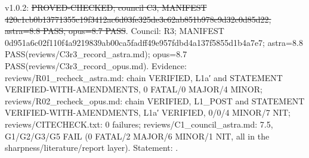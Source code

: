 \begin{theorem}\label{reg:W3-POST_Thm-1}
\end{theorem}
\begin{statusbox}
 v1.0.2: \st{PROVED-CHECKED; council C3, MANIFEST 420c1cb0b13771355c19f3412ac6d03fe325de3c62ab851b978c9d32c0d85d22, astra=8.8 PASS, opus=8.7 PASS}. Council: R3; MANIFEST 0d951a6c02f110f4a9219839ab00ca5fadff49e957fdbd4a137f5855d1b4a7e7; astra=8.8 PASS(reviews/C3r3\_record\_astra.md); opus=8.7 PASS(reviews/C3r3\_record\_opus.md). Evidence: reviews/R01\_recheck\_astra.md: chain VERIFIED, L1a′ and STATEMENT VERIFIED-WITH-AMENDMENTS, 0 FATAL/0 MAJOR/4 MINOR; reviews/R02\_recheck\_opus.md: chain VERIFIED, L1\_POST and STATEMENT VERIFIED-WITH-AMENDMENTS, L1a′ VERIFIED, 0/0/4 MINOR/7 NIT; reviews/CITECHECK.txt: 0 failures; reviews/C1\_council\_astra.md: 7.5, G1/G2/G3/G5 FAIL (0 FATAL/2 MAJOR/6 MINOR/1 NIT, all in the sharpness/literature/report layer). Statement: .
\end{statusbox}
